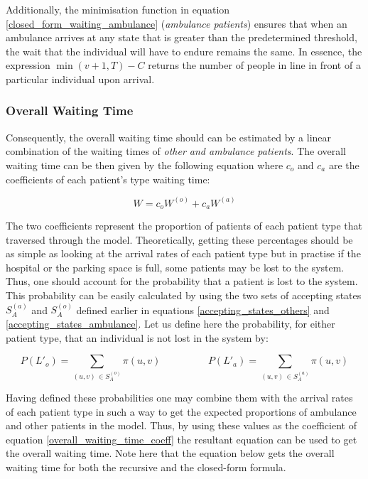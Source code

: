 Additionally, the minimisation function in equation \ref{closed_form_waiting_ambulance} (\textit{ambulance patients}) ensures that when an ambulance arrives at any state that is greater than the predetermined threshold, the wait that the individual will have to endure remains the same. In essence, the expression \(\min(v+1,T) - C\) returns the number of people in line in front of a particular individual upon arrival.


\subsubsection{Overall Waiting Time}

Consequently, the overall waiting time should can be estimated by a linear combination of the waiting times of \textit{other and ambulance patients}. The overall waiting time can be then given by the following equation where \(c_o\) and \(c_a\) are the coefficients of each patient's type waiting time:

\begin{equation}\label{overall_waiting_time_coeff}
    W = c_o W^{(o)} + c_a W^{(a)}
\end{equation}

The two coefficients represent the proportion of patients of each patient type that traversed through the model. Theoretically, getting these percentages should be as simple as looking at the arrival rates of each patient type but in practise if the hospital or the parking space is full, some patients may be lost to the system. Thus, one should account for the probability that a patient is lost to the system. This probability can be easily calculated by using the two sets of accepting states \(S_A^{(a)}\) and \(S_A^{(o)}\) defined earlier in equations \ref{accepting_states_others} and \ref{accepting_states_ambulance}. Let us define here the probability, for either patient type, that an individual is not lost in the system by:

\begin{equation*}
    P(L'_o) = \sum_{(u,v) \, \in S_A^{(o)}} \pi(u,v) \hspace{2cm}
    P(L'_a) = \sum_{(u,v) \, \in S_A^{(a)}} \pi(u,v)
\end{equation*}

Having defined these probabilities one may combine them with the arrival rates of each patient type in such a way to get the expected proportions of ambulance and other patients in the model. Thus, by using these values as the coefficient of equation \ref{overall_waiting_time_coeff} the resultant equation can be used to get the overall waiting time. Note here that the equation below gets the overall waiting time for both the recursive and the closed-form formula.

